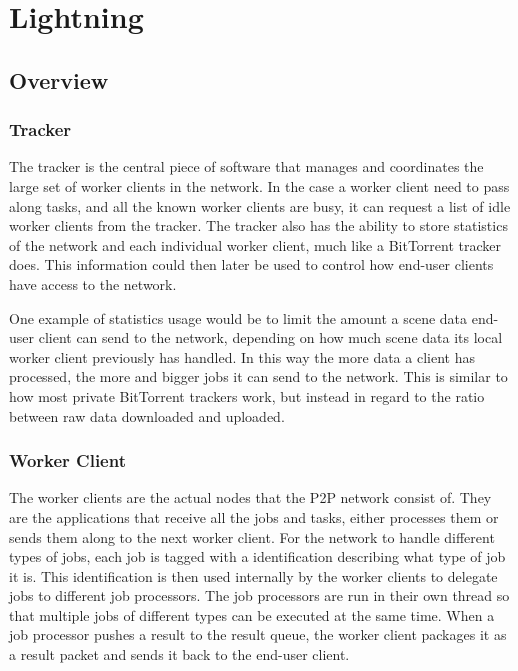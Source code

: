 \chapter{Lightning}
\section{Overview}

\subsection{Tracker}
The tracker is the central piece of software that manages and coordinates the large set of worker clients in the network.
In the case a worker client need to pass along tasks, and all the known worker clients are busy, it can request a list of idle worker clients from the tracker. The tracker also has the ability to store statistics of the network and each individual worker client, much like a BitTorrent tracker does. This information could then later be used to control how end-user clients have access to the network. 

One example of statistics usage would be to limit the amount a scene data end-user client can send to the network, depending on how much scene data its local worker client previously has handled. In this way the more data a client has processed, the more and bigger jobs it can send to the network. This is similar to how most private BitTorrent trackers work, but instead in regard to the ratio between raw data downloaded and uploaded.



\subsection{Worker Client}
The worker clients are the actual nodes that the P2P network consist of. They are the applications that receive all the jobs and tasks, either processes them or sends them along to the next worker client. For the network to handle different types of jobs, each job is tagged with a identification describing what type of job it is. This identification is then used internally by the worker clients to delegate jobs to different job processors. The job processors are run in their own thread so that multiple jobs of different types can be executed at the same time. When a job processor pushes a result to the result queue, the worker client packages it as a result packet and sends it back to the end-user client.

